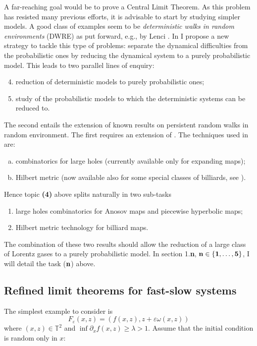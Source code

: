 \documentclass[10pt, a4paper, reqno]{amsart}
\newcommand\bT{{\mathbb T}}
\newcommand\ve{\varepsilon}
\begin{document}
A far-reaching goal would be to prove a Central Limit Theorem. As this problem has resisted many previous efforts, it is advisable to start by studying simpler models. A good class of examples seem to be {\em deterministic walks in random environments} (DWRE) as put forward, e.g., by Lenci \cite{Le06b2}. In \cite{AL18b} I propose a new strategy to tackle this type of problems: separate the dynamical difficulties from the probabilistic ones by reducing the dynamical system to a purely probabilistic model. This leads to two parallel lines of enquiry:
\begin{enumerate}[(\bf 1)]
\setcounter{enumi}{3}
\item reduction of deterministic models to purely probabilistic ones;
\item study of the probabilistic models to which the deterministic systems can be reduced to.
\end{enumerate}
The second entails the extension of known results on persistent random walks in random environment. The first requires an extension of \cite{AL18b}.
The techniques used in \cite{AL18b} are: 
\begin{enumerate}[(a)]
\item combinatorics for large holes (currently available only for expanding maps);
\item Hilbert metric (now available also for some special classes of billiards, see \cite{DL21}).
\end{enumerate}
Hence  topic {\bf(4)} above splits naturally in two sub-tasks
\begin{enumerate}[({\bf 4}-a)]
\item  large holes combinatorics for Anosov maps and piecewise hyperbolic maps;
\item Hilbert metric technology for billiard maps.
\end{enumerate}
The combination of these two results should allow the reduction of a large class of Lorentz gases to a purely probabilistic model.
In section 1.{\bf n}, ${\bf n}\in\{{\bf 1},\dots,{\bf 5}\}$, I will detail the task (${\bf n}$) above.

\subsection{Refined limit theorems for fast-slow systems}\label{sec:2limit}
The simplest example to  consider is 
\begin{equation}\label{eq:basic}
F_\ve(x,z)=(f(x,z),z+\ve\omega(x,z))
\end{equation}
where $(x,z)\in\bT^2$ and $\inf \partial_x f(x,z)\geq \lambda>1$. Assume that the initial condition is random only in $x$: 
\end{document}
